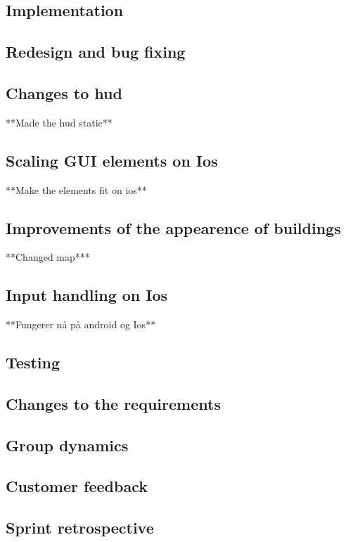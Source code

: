\subsection{Implementation}

\subsection{Redesign and bug fixing}
	
	\subsection*{Changes to hud}
		**Made the hud static**
	\subsection*{Scaling GUI elements on Ios}
		**Make the elements fit on ios**
	\subsection{Improvements of the appearence of buildings}
		**Changed map***
	\subsection{Input handling on Ios}
		**Fungerer nå på android og Ios**

\subsection{Testing}

\subsection{Changes to the requirements}

\subsection{Group dynamics}

\subsection{Customer feedback}

\subsection{Sprint retrospective}
